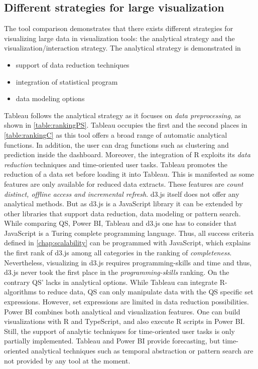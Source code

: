 \subsection{Different strategies for large visualization}
The tool comparison demonstrates that there exists different strategies for visualizing  large data in visualization tools: the analytical strategy and the visualization/interaction strategy. 
The analytical strategy is demonstrated in
\begin{itemize}
    \item support of data reduction techniques
    \item integration of statistical program
    \item data modeling options
\end{itemize}
Tableau follows the analytical strategy as it focuses on \textit{data preprocessing}, as shown in \ref{table:rankingPS}. Tableau occupies the first and the second places in \ref{table:rankingC} as this tool offers a broad range of automatic analytical functions. In addition, the user can drag functions such as clustering and prediction inside the dashboard. Moreover, the integration of R exploits its \textit{data reduction} techniques and time-oriented user tasks. Tableau  promotes the reduction of a data set before loading it into Tableau. This is manifested as some features are only available for reduced data extracts. These features are \textit{count distinct, offline access and incremental refresh}. d3.js itself does not offer any analytical methods. But as d3.js is a JavaScript library it can be extended by other libraries that support data reduction, data modeling or pattern search. While comparing QS, Power BI, Tableau and d3.js one has to consider that JavaScript is a Turing complete programming language. Thus, all success criteria defined in \ref{chap:scalability} can be programmed with JavaScript, which explains the first rank of d3.js among all categories in the ranking of \textit{completeness}. Nevertheless, visualizing in d3.js requires programming-skills and time and thus, d3.js never took the first place in the \textit{programming-skills} ranking.
On the contrary QS' lacks in analytical options. While Tableau can integrate R-algorithms to reduce data, \gls{QS}   can only manipulate data with the \gls{QS}   specific set expressions. However, set expressions are limited in data reduction possibilities.\\
Power BI combines both analytical and visualization features. One can build visualizations with R and TypeScript, and also execute R scripts in Power BI. \\
Still, the support of analytic techniques for time-oriented user tasks is only partially implemented. Tableau and Power BI provide forecasting, but time-oriented analytical techniques such as temporal abstraction or pattern search are not provided by any tool at the moment.
\par

